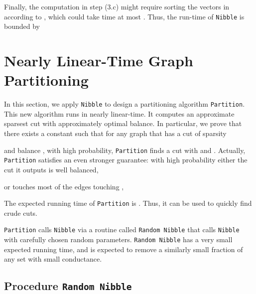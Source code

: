 \documentclass[11pt]{article}
\begin{document}
Finally, the computation in step (3.c) might require sorting the vectors
  in  according to , which could take time at most
  .
Thus, the run-time of \texttt{Nibble} is bounded by



\section{Nearly Linear-Time Graph Partitioning}\label{sec:cut}

In this section, we apply \texttt{Nibble} to design a partitioning
  algorithm \texttt{Partition}.
This new algorithm runs in nearly linear-time.
It computes an approximate sparsest
  cut with approximately optimal balance.
In particular, we prove that there exists a constant 
  such that for any graph  that has a cut  of sparsity 
  
  and balance , with high probability, \texttt{Partition} finds a
  cut  with   and
  .
Actually, \texttt{Partition} satisfies an even stronger
  guarantee: with high probability
  either the cut it outputs is well balanced,

or touches most of the edges touching ,

The expected running time of \texttt{Partition} is .
Thus, it can be used to quickly find crude cuts.


\texttt{Partition}
  calls \texttt{Nibble} via a routine
  called \texttt{Random Nibble} that calls \texttt{Nibble}
  with carefully chosen random parameters.
\texttt{Random Nibble}
  has a very small expected running time, and
  is expected to remove a similarly small fraction of
  any set with small conductance.



\subsection{Procedure \texttt{Random Nibble}}

\vskip 0.2in
\noindent
{}
\vskip 0.2in
\end{document}
